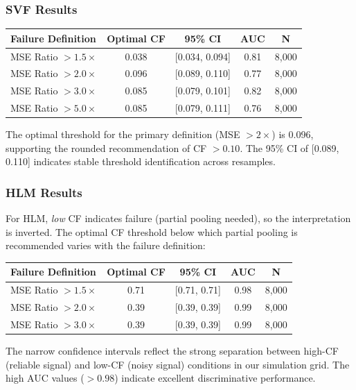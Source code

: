 \documentclass[10pt]{article} %
\theoremstyle{plain}
\theoremstyle{definition}
\begin{document}
\subsubsection{SVF Results}

\begin{center}
\begin{tabular}{lcccc}
\toprule
Failure Definition & Optimal CF & 95\% CI & AUC & N \\
\midrule
MSE Ratio $> 1.5\times$ & 0.038 & [0.034, 0.094] & 0.81 & 8,000 \\
MSE Ratio $> 2.0\times$ & 0.096 & [0.089, 0.110] & 0.77 & 8,000 \\
MSE Ratio $> 3.0\times$ & 0.085 & [0.079, 0.101] & 0.82 & 8,000 \\
MSE Ratio $> 5.0\times$ & 0.085 & [0.079, 0.111] & 0.76 & 8,000 \\
\bottomrule
\end{tabular}
\end{center}

The optimal threshold for the primary definition (MSE $> 2\times$) is 0.096, supporting the rounded recommendation of CF $> 0.10$. The 95\% CI of [0.089, 0.110] indicates stable threshold identification across resamples.

\subsubsection{HLM Results}

For HLM, \emph{low} CF indicates failure (partial pooling needed), so the interpretation is inverted. The optimal CF threshold below which partial pooling is recommended varies with the failure definition:

\begin{center}
\begin{tabular}{lcccc}
\toprule
Failure Definition & Optimal CF & 95\% CI & AUC & N \\
\midrule
MSE Ratio $> 1.5\times$ & 0.71 & [0.71, 0.71] & 0.98 & 8,000 \\
MSE Ratio $> 2.0\times$ & 0.39 & [0.39, 0.39] & 0.99 & 8,000 \\
MSE Ratio $> 3.0\times$ & 0.39 & [0.39, 0.39] & 0.99 & 8,000 \\
\bottomrule
\end{tabular}
\end{center}

The narrow confidence intervals reflect the strong separation between high-CF (reliable signal) and low-CF (noisy signal) conditions in our simulation grid. The high AUC values ($> 0.98$) indicate excellent discriminative performance.
\end{document}

